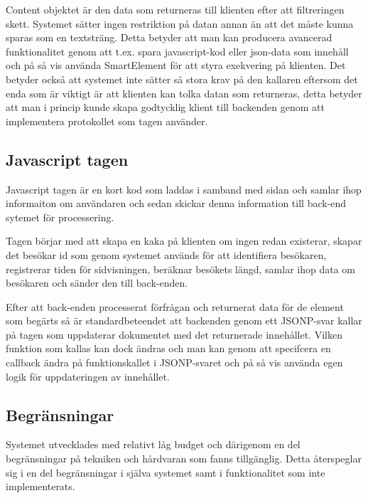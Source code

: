 Content objektet är den data som returneras till klienten efter att filtreringen skett. Systemet sätter ingen restriktion på datan annan än att det måste kunna sparas som en textsträng. Detta betyder att man kan producera avancerad funktionalitet genom att t.ex. spara javascript-kod eller json-data som innehåll och på så vis använda SmartElement för att styra exekvering på klienten. Det betyder också att systemet inte sätter så stora krav på den kallaren eftersom det enda som är viktigt är att klienten kan tolka datan som returneras, detta betyder att man i princip kunde skapa godtycklig klient till backenden genom att implementera protokollet som tagen använder.

\subsection{Javascript tagen}

Javascript tagen är en kort kod som laddas i samband med sidan och samlar ihop informaiton om användaren och sedan skickar denna information till back-end sytemet för processering.

Tagen börjar med att skapa en kaka på klienten om ingen redan existerar, skapar det besökar id som genom systemet används för att identifiera besökaren, registrerar tiden för sidvisningen, beräknar besökets längd, samlar ihop data om besökaren och sänder den till back-enden.

Efter att back-enden processerat förfrågan och returnerat data för de element som begärts så är standardbeteendet att backenden genom ett JSONP-svar kallar på tagen som uppdaterar dokumentet med det returnerade innehållet. Vilken funktion som kallas kan dock ändras och man kan genom att specifcera en callback ändra på funktionskallet i JSONP-svaret och på så vis använda egen logik för uppdateringen av innehållet.

\subsection{Begränsningar}

Systemet utvecklades med relativt låg budget och därigenom en del begränsningar på tekniken och hårdvaran som fanns tillgänglig. Detta återspeglar sig i en del begränsningar i själva systemet samt i funktionalitet som inte implementerats.



